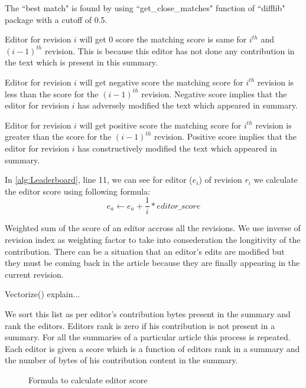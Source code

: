 \documentclass[12pt]{article}
\begin{document}
The ``best match" is found by using ``get\_close\_matches" function of ``difflib" package with a cutoff of 0.5.


Editor for revision $i$ will get 0 score the matching score is same for $i^{th}$ and $(i-1)^{th}$ revision. This is because this editor has not done any contribution in the text which is present in this summary.

Editor for revision $i$ will get negative score the matching score for $i^{th}$ revision is less than the score  for the $(i-1)^{th}$ revision.  Negative score implies that the editor for revision $i$ has adversely modified the text which appeared in summary. 

Editor for revision $i$ will get positive score the matching score for $i^{th}$ revision is greater than the score  for the $(i-1)^{th}$ revision. Positive score implies that the editor for revision $i$ has constructively modified the text which appeared in summary. 


In \ref{alg:Leaderboard}, line 11, we can see for editor ($e_i$) of revision $r_i$ we calculate the editor score using following formula:
$$e_a \gets e_a + \frac{1}{i} * editor\_score$$

Weighted sum of the score of an editor accross all the revisions. We use inverse of revision index as weighting factor to take into consederation the longitivity of the contribution. There can be a situation that an editor's edits are modified but they must be coming back in the article because they are finally appearing in the current revision.

Vectorize() explain...

We sort this list as per editor's contribution bytes present in the summary and rank the editors. Editors rank is zero if his contribution is not present in a summary. For all the summaries of a particular article this process is repeated. Each editor is given a score which is a function of editors rank in a summary and the number of bytes of his contribution content in the summary.   



\begin{figure}[!htb]
        \caption{\label{fig:editor_contrib} Formula to calculate editor score}
\end{figure}
\end{document}
